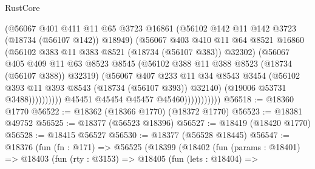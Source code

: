 \begin{lexlean}{RustCore}
\begin{coremodule}
                                    (@56067
                                      @401
                                      @411
                                      @11
                                      @65
                                      @3723
                                      @16861
                                      (@56102 @142 @11 @142 @3723 (@18734 (@56107 @142)) @18949)
                                      (@56067
                                        @403
                                        @410
                                        @11
                                        @64
                                        @8521
                                        @16860
                                        (@56102 @383 @11 @383 @8521 (@18734 (@56107 @383)) @32302)
                                        (@56067
                                          @405
                                          @409
                                          @11
                                          @63
                                          @8523
                                          @8545
                                          (@56102 @388 @11 @388 @8523 (@18734 (@56107 @388)) @32319)
                                          (@56067
                                            @407
                                            @233
                                            @11
                                            @34
                                            @8543
                                            @3454
                                            (@56102
                                              @393
                                              @11
                                              @393
                                              @8543
                                              (@18734 (@56107 @393))
                                              @32140)
                                            (@19006 @53731 @3488))))))))))
                          @45451
                          @45454
                          @45457
                          @45460)))))))))))
@56518 := @18360 @1770
@56522 := @18362 (@18366 @1770) (@18372 @1770)
@56523 := @18381 @49752
@56525 := @18377 (@56523 @18396)
@56527 := @18419 (@18420 @1770)
@56528 := @18415 @56527
@56530 := @18377 (@56528 @18445)
@56547 := @18376
    (fun (fn : @171) =>
    @56525
      (@18399
        (@18402
          (fun (params : @18401) =>
          @18403
            (fun (rty : @3153) =>
            @18405
              (fun (lets : @18404) =>

\end{coremodule}
\end{lexlean}
